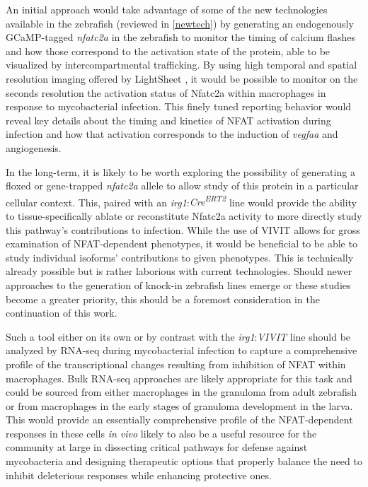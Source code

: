 An initial approach would take advantage of some of the new technologies available in the zebrafish (reviewed in \autoref{newtech}) by generating an endogenously GCaMP\hyp{}tagged \textit{nfatc2a} in the zebrafish to monitor the timing of calcium flashes and how those correspond to the activation state of the protein, able to be visualized by intercompartmental trafficking. By using high temporal and spatial resolution imaging offered by LightSheet \citep{Reynaud2008}, it would be possible to monitor on the seconds resolution the activation status of Nfatc2a within macrophages in response to mycobacterial infection. This finely tuned reporting behavior would reveal key details about the timing and kinetics of NFAT activation during infection and how that activation corresponds to the induction of \textit{vegfaa} and angiogenesis.

In the long\hyp{}term, it is likely to be worth exploring the possibility of generating a floxed or gene\hyp{}trapped \textit{nfatc2a} allele to allow study of this protein in a particular cellular context. This, paired with an \textit{irg1}:\textit{Cre\textsuperscript{ERT2}} line would provide the ability to tissue\hyp{}specifically ablate or reconstitute Nfatc2a activity to more directly study this pathway's contributions to infection. While the use of VIVIT allows for gross examination of NFAT\hyp{}dependent phenotypes, it would be beneficial to be able to study individual isoforms' contributions to given phenotypes. This is technically already possible but is rather laborious with current technologies. Should newer approaches to the generation of knock\hyp{}in zebrafish lines emerge or these studies become a greater priority, this should be a foremost consideration in the continuation of this work.

Such a tool either on its own or by contrast with the \textit{irg1}:\textit{VIVIT} line should be analyzed by RNA\hyp{}seq during mycobacterial infection to capture a comprehensive profile of the transcriptional changes resulting from inhibition of NFAT within macrophages. Bulk RNA\hyp{}seq approaches are likely appropriate for this task and could be sourced from either macrophages in the granuloma from adult zebrafish or from macrophages in the early stages of granuloma development in the larva. This would provide an essentially comprehensive profile of the NFAT\hyp{}dependent responses in these cells \textit{in vivo} likely to also be a useful resource for the community at large in dissecting critical pathways for defense against mycobacteria and designing therapeutic options that properly balance the need to inhibit deleterious responses while enhancing protective ones.

